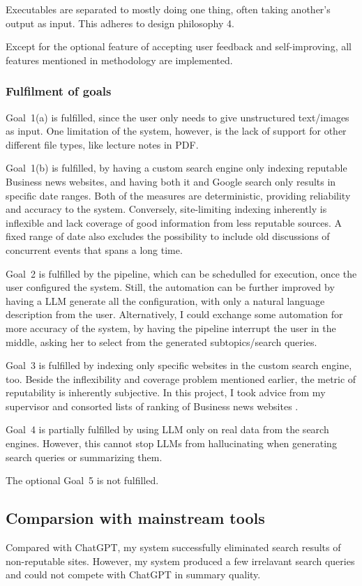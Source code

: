 \documentclass[final-report]{report-template}
\begin{document}
Executables are separated to mostly doing one thing, often taking another's
output as input. This adheres to design philosophy 4.

Except for the optional feature of accepting user feedback and self-improving,
all features mentioned in methodology are implemented. 

\subsubsection{Fulfilment of goals}
Goal~1(a) is fulfilled, since the user only needs to give unstructured
text/images as input. One limitation of the system, however, is the lack of
support for other different file types, like lecture notes in PDF.

Goal~1(b) is fulfilled, by having a custom search engine only indexing
reputable Business news websites, and having both it and Google search only
results in specific date ranges. Both of the measures are deterministic,
providing reliability and accuracy to the system. Conversely, site-limiting
indexing inherently is inflexible and lack coverage of good information from
less reputable sources. A fixed range of date also excludes the possibility to
include old discussions of concurrent events that spans a long time.

Goal~2 is fulfilled by the pipeline, which can be schedulled for execution,
once the user configured the system. Still, the automation can be further
improved by having a LLM generate all the configuration, with only a natural
language description from the user. Alternatively, I could exchange some
automation for more accuracy of the system, by having the pipeline interrupt
the user in the middle, asking her to select from the generated
subtopics/search queries.

Goal~3 is fulfilled by indexing only specific websites in the custom search
engine, too. Beside the inflexibility and coverage problem mentioned earlier,
the metric of reputability is inherently subjective. In this project, I took
advice from my supervisor and consorted lists of ranking of Business news
websites \cite{business.news.ranking.1, business.news.ranking.2}.

Goal~4 is partially fulfilled by using LLM only on real data from the search
engines. However, this cannot stop LLMs from hallucinating when generating
search queries or summarizing them.

The optional Goal~5 is not fulfilled.

\subsection{Comparsion with mainstream tools}
Compared with ChatGPT, my system successfully eliminated search results of
non-reputable sites. However, my system produced a few irrelavant search
queries and could not compete with ChatGPT in summary quality.
\end{document}
